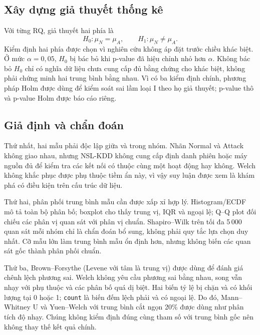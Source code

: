 \documentclass[../main.tex]{subfiles}
\begin{document}
\subsection{Xây dựng giả thuyết thống kê}
\label{sec:t35:hypotheses}

Với từng RQ, giả thuyết hai phía là
\begin{equation}
  H_0:\mu_N=\mu_A,
  \qquad
  H_1:\mu_N\ne\mu_A.
  \label{eq:t35:hypotheses}
\end{equation}
Kiểm định hai phía được chọn vì nghiên cứu không áp đặt trước chiều khác biệt. Ở mức
$\alpha=0{,}05$, $H_0$ bị bác bỏ khi p-value đã hiệu chỉnh nhỏ hơn $\alpha$. Không
bác bỏ $H_0$ chỉ có nghĩa dữ liệu chưa cung cấp đủ bằng chứng cho khác biệt, không phải
chứng minh hai trung bình bằng nhau. Vì có ba kiểm định chính, phương pháp Holm được
dùng để kiểm soát sai lầm loại I theo họ giả thuyết; p-value thô và p-value Holm được
báo cáo riêng.

\subsection{Giả định và chẩn đoán}
\label{sec:t35:assumptions}

Thứ nhất, hai mẫu phải độc lập giữa và trong nhóm. Nhãn Normal và Attack không giao
nhau, nhưng NSL-KDD không cung cấp định danh phiên hoặc máy nguồn đủ để kiểm tra các
kết nối có thuộc cùng một hoạt động hay không. Welch không khắc phục được phụ thuộc
tiềm ẩn này, vì vậy suy luận được xem là khám phá có điều kiện trên cấu trúc dữ liệu.

Thứ hai, phân phối trung bình mẫu cần được xấp xỉ hợp lý. Histogram/ECDF mô tả toàn bộ
phân bố; boxplot cho thấy trung vị, IQR và ngoại lệ; Q--Q plot đối chiếu các phân vị
quan sát với phân vị chuẩn. Shapiro--Wilk trên tối đa 5\,000 quan sát mỗi nhóm chỉ là
chẩn đoán bổ sung, không phải quy tắc lựa chọn duy nhất. Cỡ mẫu lớn làm trung bình mẫu
ổn định hơn, nhưng không biến các quan sát gốc thành phân phối chuẩn.

Thứ ba, Brown--Forsythe (Levene với tâm là trung vị) được dùng để đánh giá chênh lệch
phương sai. Welch không yêu cầu phương sai bằng nhau, song vẫn nhạy với phụ thuộc và
các phân bố quá dị biệt. Hai biến tỷ lệ bị chặn và có khối lượng tại 0 hoặc 1;
\texttt{count} là biến đếm lệch phải và có ngoại lệ. Do đó, Mann--Whitney U và
Yuen--Welch với trung bình cắt ngọn 20\% được dùng như phân tích độ nhạy. Chúng không
kiểm định đúng cùng tham số với trung bình gốc nên không thay thế kết quả chính.
\end{document}
